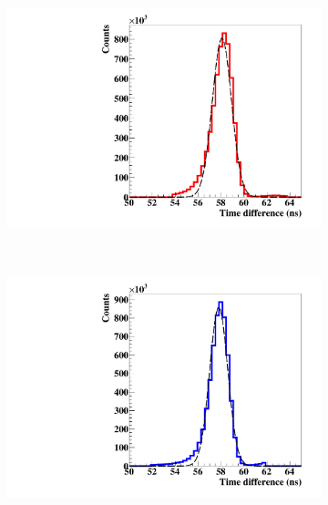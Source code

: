 \documentclass[a4paper,11pt]{article}
\begin{document}
\begin{figure}[htb]
\centering
    \begin{subfigure}{0.3\textwidth} \centering \includegraphics[width=\textwidth]{figures/time_X_43kHz_August.pdf} \caption{} \label{fig:Time_43kHza}
    \end{subfigure}
    ~
    \begin{subfigure}{0.3\textwidth} \centering \includegraphics[width=\textwidth]{figures/time_Y_43kHz_August.pdf} \caption{} \label{fig:Time_43kHzb}
    \end{subfigure}    
    ~

\end{figure}
\end{document}
